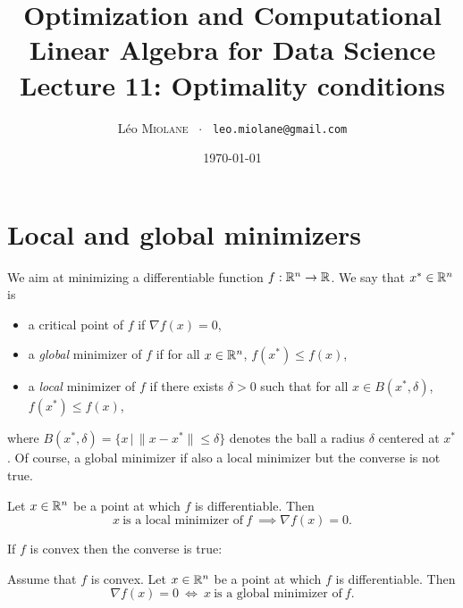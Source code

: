 \documentclass[11pt,nocut]{article}
\title{\vspace{-2.0cm}%
	Optimization and Computational Linear Algebra for Data Science\\
Lecture 11: Optimality conditions}
\author{Léo \textsc{Miolane} \ $\cdot$ \ \texttt{leo.miolane@gmail.com}}
\date{\today}
\begin{document}
\maketitle


\section{Local and global minimizers}

We aim at minimizing a differentiable function $f: \mathbb{R}^n \to \mathbb{R}$.
We say that $x^* \in \mathbb{R}^n$ is
\begin{itemize}
	\item a critical point of $f$ if $\nabla f(x) = 0$,
	\item a \emph{global} minimizer of $f$ if for all $x \in \mathbb{R}^n$, $f(x^*) \leq f(x)$,
	\item a \emph{local} minimizer of $f$ if there exists $\delta > 0$ such that for all $x \in B(x^*,\delta)$, $f(x^*) \leq f(x)$,
\end{itemize}
where $B(x^*,\delta) = \{x \, | \, \|x-x^*\| \leq \delta \}$ denotes the ball a radius $\delta$ centered at $x^*$.
Of course, a global minimizer if also a local minimizer but the converse is not true.

\begin{proposition}\label{prop:zero_grad}
	Let $x \in \mathbb{R}^n$ be a point at which $f$ is differentiable. 
	Then
	$$
	x \ \text{is a local minimizer of} \ f \ \implies \nabla f(x) = 0.
	$$
\end{proposition}

If $f$ is convex then the converse is true:

\begin{proposition}\label{prop:zero_grad_convex}
	Assume that $f$ is convex.
	Let $x \in \mathbb{R}^n$ be a point at which $f$ is differentiable. 
	Then
	$$
	\nabla f(x) = 0 \ \Longleftrightarrow \ x \ \text{is a global minimizer of} \ f.
	$$
\end{proposition}
\end{document}
